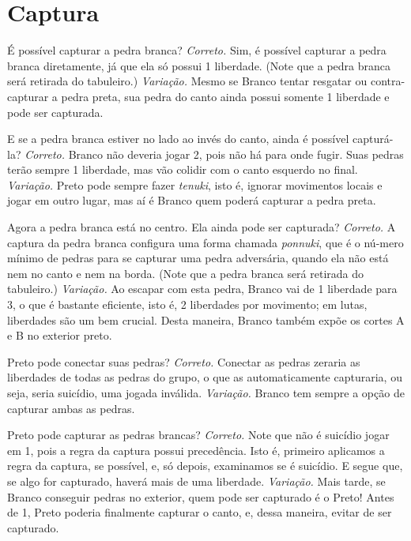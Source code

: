 \chapter{Captura}

\problemDiagrams
  {É possível capturar a pedra branca?}
\answerDiagrams
  {\emph{Correto.} Sim, é possível capturar a pedra branca diretamente, já que ela só possui 1 liberdade. (Note que a pedra branca será retirada do tabuleiro.)}
  {\emph{Variação.} Mesmo se Branco tentar resgatar ou contra-capturar a pedra preta, sua pedra do canto ainda possui somente 1 liberdade e pode ser capturada.}

\problemDiagrams
  {E se a pedra branca estiver no lado ao invés do canto, ainda é possível capturá-la?}
\answerDiagrams
  {\emph{Correto.} Branco não deveria jogar 2, pois não há para onde fugir. Suas pedras terão sempre 1 liberdade, mas vão colidir com o canto esquerdo no final.}
  {\emph{Variação.} Preto pode sempre fazer \emph{tenuki}, isto é, ignorar movimentos locais e jogar em outro lugar, mas aí é Branco quem poderá capturar a pedra preta.}

\problemDiagrams
  {Agora a pedra branca está no centro. Ela ainda pode ser capturada?}
\answerDiagrams
  {\emph{Correto.} A captura da pedra branca configura uma forma chamada \emph{ponnuki}, que é o nú-mero mínimo de pedras para se capturar uma pedra adversária, quando ela não está nem no canto e nem na borda. (Note que a pedra branca será retirada do tabuleiro.)}
  {\emph{Variação.} Ao escapar com esta pedra, Branco vai de 1 liberdade para 3, o que é bastante eficiente, isto é, 2 liberdades por movimento; em lutas, liberdades são um bem crucial. Desta maneira, Branco também expõe os cortes A e B no exterior preto.}

\problemDiagrams
  {Preto pode conectar suas pedras?}
\answerDiagrams
  {\emph{Correto.} Conectar as pedras zeraria as liberdades de todas as pedras do grupo, o que as automaticamente capturaria, ou seja, seria suicídio, uma jogada inválida.}
  {\emph{Variação.} Branco tem sempre a opção de capturar ambas as pedras.}

\problemDiagrams
  {Preto pode capturar as pedras brancas?}
\answerDiagrams
  {\emph{Correto.} Note que não é suicídio jogar em 1, pois a regra da captura possui precedência. Isto é, primeiro aplicamos a regra da captura, se possível, e, só depois, examinamos se é suicídio. E segue que, se algo for capturado, haverá mais de uma liberdade.}
  {\emph{Variação.} Mais tarde, se Branco conseguir pedras no exterior, quem pode ser capturado é o Preto! Antes de 1, Preto poderia finalmente capturar o canto, e, dessa maneira, evitar de ser capturado.}

